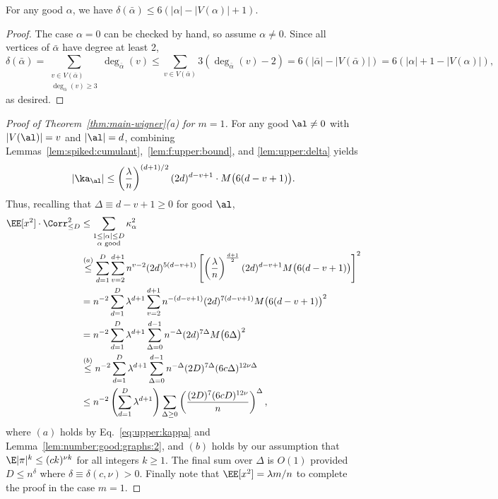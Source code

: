 \documentclass[11pt]{article}
\begin{document}
\begin{lemma}\label{lem:upper:delta}
For any good $\alpha$, we have $\delta(\bar\alpha) \le 6(|\alpha|-|V(\alpha)|+1)$.
\end{lemma}
\begin{proof}
The case $\alpha = 0$ can be checked by hand, so assume $\alpha \ne 0$. Since all vertices of $\bar\alpha$ have degree at least 2,
\[ \delta(\bar\alpha) = \sum_{\substack{v \in V(\bar\alpha) \\ \deg_{\bar\alpha}(v) \ge 3}} \deg_{\bar\alpha}(v) \le \sum_{v \in V(\bar\alpha)} 3(\deg_{\bar\alpha}(v) - 2) = 6(|\bar\alpha| - |V(\bar\alpha)|) = 6(|\alpha| + 1 - |V(\alpha)|), \]
as desired.
\end{proof}
\begin{proof}[Proof of Theorem~\ref{thm:main-wigner}(a) for $m=1$] For any good $\al\neq 0$ with $|V(\al)|=v$ and $|\al|=d$, combining Lemmas~\ref{lem:spiked:cumulant},~\ref{lem:f:upper:bound}, and \ref{lem:upper:delta} yields
\begin{equation}\label{eq:upper:kappa}
|\ka_{\al}|\leq \left(\frac{\lambda}{n}\right)^{(d+1)/2} (2d)^{d-v+1} \cdot M\big(6(d-v+1)\big).
\end{equation}
Thus, recalling  that $\Delta\equiv d-v+1 \ge 0$ for good $\al$,
\begin{align*}
\EE[x^2] \cdot \Corr^2_{\le D} &\le \sum_{\substack{1 \le |\alpha| \le D \\ \alpha \text{ good}}} \kappa_\alpha^2 \\
&\stackrel{(a)}{\le} \sum_{d=1}^D \sum_{v=2}^{d+1} n^{v-2}(2d)^{5(d-v+1)} \left[\left(\frac{\lambda}{n}\right)^{\frac{d+1}{2}} (2d)^{d-v+1} M\big(6(d-v+1)\big)\right]^2 \\
&= n^{-2} \sum_{d=1}^D \lambda^{d+1} \sum_{v=2}^{d+1} n^{-(d-v+1)}(2d)^{7(d-v+1)} M\big(6(d-v+1)\big)^2 \\
&= n^{-2} \sum_{d=1}^D \lambda^{d+1} \sum_{\Delta = 0}^{d-1} n^{-\Delta}(2d)^{7\Delta} M\big(6\Delta\big)^2 \\
&\stackrel{(b)}{\le} n^{-2} \sum_{d=1}^D \lambda^{d+1} \sum_{\Delta = 0}^{d-1} n^{-\Delta}(2D)^{7\Delta} (6c\Delta)^{12\nu\Delta} \\
&\le n^{-2} \left(\sum_{d=1}^D \lambda^{d+1}\right) \sum_{\Delta \ge 0} \left(\frac{(2D)^7 (6cD)^{12\nu}}{n}\right)^\Delta,
\end{align*}
where $(a)$ holds by Eq.~\eqref{eq:upper:kappa} and Lemma~\ref{lem:number:good:graphs:2}, and $(b)$ holds by our assumption that $\E|\pi|^{k}\leq (ck)^{\nu k}$ for all integers $k\geq 1$. The final sum over $\Delta$ is $O(1)$ provided $D\leq n^{\delta}$ where $\delta\equiv \delta(c,\nu)>0$. Finally note that $\EE[x^2] = \lambda m/n$ to complete the proof in the case $m=1$.
\end{proof}
\end{document}
